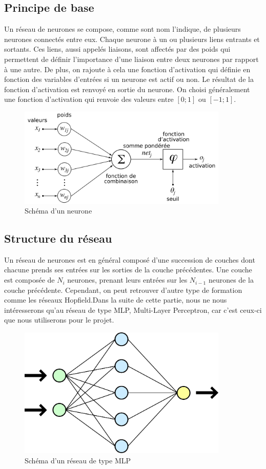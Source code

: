 \documentclass[11pt]{report}
\begin{document}
\subsection{Principe de base}

Un réseau de neurones se compose, comme sont nom l'indique, de plusieurs neurones connectés entre eux. Chaque neurone à un ou plusieurs liens entrants et sortants. Ces liens, aussi appelés liaisons, sont affectés par des poids qui permettent de définir l'importance d'une liaison entre deux neurones par rapport à une autre. De plus, on rajoute à cela une fonction d'activation qui définie en fonction des variables d'entrées si un neurone est actif ou non. Le résultat de la fonction d'activation est renvoyé en sortie du neurone. On choisi généralement une fonction d'activation qui renvoie des valeurs entre $[0; 1]$ ou $[-1; 1]$.

\begin{figure}[htbp]
\centering
\includegraphics[width=10cm]{perceptron.png}
\caption{Schéma d'un neurone}
\end{figure}

\subsection{Structure du réseau}

Un réseau de neurones est en général composé d'une succession de couches dont chacune prends ses entrées sur les sorties de la couche précédentes. Une couche est composée de $N_{i}$ neurones, prenant leurs entrées sur les $N_{i-1}$ neurones de la couche précédente. Cependant, on peut retrouver d'autre type de formation comme les réseaux Hopfield.Dans la suite de cette partie, nous ne nous intéresserons qu'au réseau de type MLP, Multi-Layer Perceptron, car c'est ceux-ci que nous utiliserons pour le projet.

\begin{figure}[htbp]
\centering
\includegraphics[width=10cm]{mlp.png}
\caption{Schéma d'un réseau de type MLP}
\label{MLP}
\end{figure}
\end{document}
